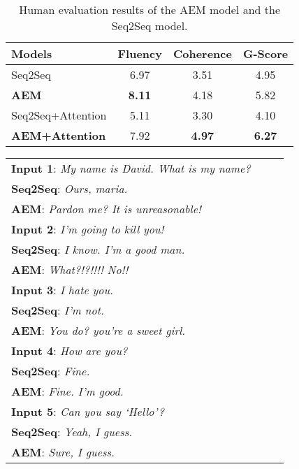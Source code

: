 \documentclass[11pt,a4paper]{article}
\begin{document}
\begin{CJK}{UTF8}{song}
\begin{table}[t]
\begin{tabular}{l|c|c|c}
    Models & Fluency & Coherence & G-Score \\ \hline
    Seq2Seq& 6.97 & 3.51 & 4.95\\
   \textbf{AEM}   & \textbf{8.11} & 4.18 & 5.82\\\hline
   Seq2Seq+Attention& 5.11 & 3.30 & 4.10\\
   \textbf{AEM+Attention} & 7.92 & \textbf{4.97} & \textbf{6.27}\\\hline 
    \end{tabular}
    \caption{Human evaluation results of the AEM model and the Seq2Seq model. }
    \label{tab:human}
    
\end{table}













\begin{table}[t]
\centering
    \begin{tabular}{p{0.9\linewidth}}
    \hline
\textbf{Input 1}: \textsl{My name is David. What is my name? }\\
        \textbf{Seq2Seq}: \textsl{ Ours, maria.}\\ 
    \textbf{AEM}: \textsl{ Pardon me? It is unreasonable!}\\ \hline
    
     \textbf{Input 2}: \textsl{I'm going to kill you! }\\
     \textbf{Seq2Seq}: \textsl{ I know. I'm a good man.}\\ 
    \textbf{AEM}: \textsl{ What?!?!!!! No!!}\\ \hline
    
     \textbf{Input 3}: \textsl{I hate you. }\\
     \textbf{Seq2Seq}: \textsl{I'm not. }\\
    \textbf{AEM}: \textsl{You do? you're a sweet girl.}\\ \hline
    
    
     \textbf{Input 4}: \textsl{How are you?}\\
     \textbf{Seq2Seq}: \textsl{ Fine.}\\ 
    \textbf{AEM}: \textsl{Fine. I'm good.}\\ \hline
    
      \textbf{Input 5}: \textsl{Can you say `Hello'? }\\
      \textbf{Seq2Seq}: \textsl{ Yeah, I guess.}\\ 
    \textbf{AEM}: \textsl{Sure, I guess.}\\ \hline
    





\end{tabular}
\end{table}
\end{CJK}
\end{document}
